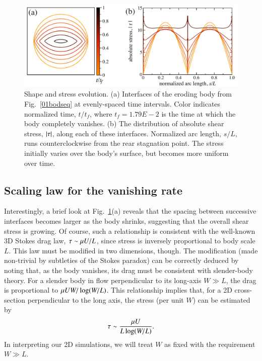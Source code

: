 \documentclass[preprint, 10pt]{elsarticle}
\begin{document}
\begin{figure}%
\begin{center}
\includegraphics[width = 0.75 \textwidth]{./figs/shrink_intface.pdf}
\caption{\label{shrink_intface} Shape and stress evolution. (a)
Interfaces of the eroding body from Fig.~\ref{01bodseq} at evenly-spaced
time intervals. Color indicates normalized time, $t/t_f$, where $t_f =
1.79E-2$ is the time at which the body completely vanishes. (b) The
distribution of absolute shear stress, $\lvert \tau \rvert$, along each of these
interfaces. Normalized arc length, $s/L$, runs counterclockwise from the
rear stagnation point. The stress initially varies over the body's
surface, but becomes more uniform over time.}
\end{center}
\end{figure}

\subsection{Scaling law for the vanishing rate}

Interestingly, a brief look at Fig.~\ref{shrink_intface}(a) reveals that
the spacing between successive interfaces becomes larger as the body
shrinks, suggesting that the overall shear stress is growing. Of course,
such a relationship is consistent with the well-known 3D Stokes drag
law, $\tau \sim \mu U / L$, since stress is inversely proportional
to body scale $L$. This law must be modified in two dimensions, though.
The modification (made non-trivial by subtleties of the Stokes paradox)
can be correctly deduced by noting that, as the body vanishes, its drag
must be consistent with slender-body theory. For a slender body in flow
perpendicular to its long-axis $W \gg L$, the drag is proportional to
$\mu U W/ \log(W/L)$. This relationship implies that, for a 2D
cross-section perpendicular to the long axis, the stress (per unit $W$)
can be estimated by
\begin{align}
  \label{eqn:stresslaw}
  \tau \sim \frac{\mu U}{L \log(W/L)}.
\end{align}
In interpreting our 2D simulations, we will treat $W$ as fixed with the
requirement $W \gg L$.
\end{document}
